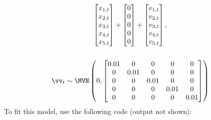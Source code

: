 \begin{gather*}
\begin{bmatrix}x_{1,t}\\x_{2,t}\\x_{3,t}\\x_{4,t}\\x_{5,t}\end{bmatrix}
+ \begin{bmatrix}0\\0\\0\\0\\0\end{bmatrix}
+ \begin{bmatrix}v_{1,t}\\ v_{2,t}\\ v_{3,t}\\ v_{4,t}\\ v_{5,t}\end{bmatrix},  \\
\\
\vv_t \sim \MVN\begin{pmatrix} 0,\begin{bmatrix}0.01&0&0&0&0\\0&0.01&0&0&0\\0&0&0.01&0&0\\0&0&0&0.01&0\\0&0&0&0&0.01\end{bmatrix} \end{pmatrix} \\
\end{gather*}
To fit this model, use the following code (output not shown):


